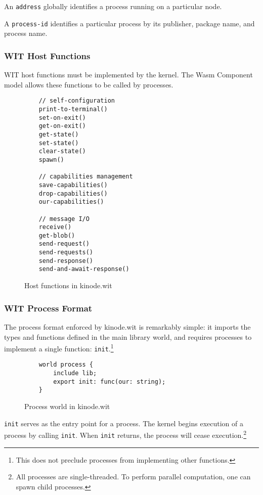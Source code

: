 \documentclass[runningheads]{llncs}
\begin{document}
An \verb|address| globally identifies a process running on a particular node.

A \verb|process-id| identifies a particular process by its publisher, package name, and process name.

\subsubsection{WIT Host Functions}
\label{sec:oswitfuncs}

WIT host functions must be implemented by the kernel.
The Wasm Component model allows these functions to be called by processes.

\begin{figure}[H]
    \centering
    \begin{verbatim}
    // self-configuration
    print-to-terminal()
    set-on-exit()
    get-on-exit()
    get-state()
    set-state()
    clear-state()
    spawn()

    // capabilities management
    save-capabilities()
    drop-capabilities()
    our-capabilities()

    // message I/O
    receive()
    get-blob()
    send-request()
    send-requests()
    send-response()
    send-and-await-response()
    \end{verbatim}
    \caption{Host functions in kinode.wit}
    \label{fig:WIT Functions}
\end{figure}

\subsubsection{WIT Process Format}
\label{sec:oswitprocess}

The process format enforced by kinode.wit is remarkably simple: it imports the types and functions defined in the main library world, and requires processes to implement a single function: \verb|init|.\footnote{This does not preclude processes from implementing other functions.}

\begin{figure}[H]
    \centering
    \begin{verbatim}
    world process {
        include lib;
        export init: func(our: string);
    }
    \end{verbatim}
    \caption{Process world in kinode.wit}
    \label{fig:Process world}
\end{figure}

\verb|init| serves as the entry point for a process.
The kernel begins execution of a process by calling \verb|init|.
When \verb|init| returns, the process will cease execution.\footnote{All processes are single-threaded. To perform parallel computation, one can spawn child processes.}
\end{document}
